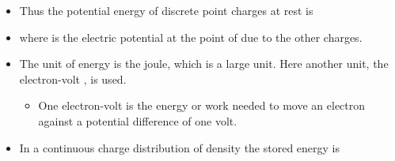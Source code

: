 \begin{ELjoin}

\begin{itemize}
\tightlist
\item
  Thus the potential energy of  discrete point charges at rest is
\end{itemize}

\begin{ELimportant}{}


\end{ELimportant}

\end{ELjoin}

\begin{ELunit}

\begin{itemize}
\tightlist
\item
  where  is the electric potential at the point of  due to the other charges.
\item
  The  unit of energy is the joule, which is a large unit. Here another unit, the electron-volt , is used.

  \begin{itemize}
  \tightlist
  \item
    One electron-volt is the energy or work needed to move an electron against a potential difference of one volt.
  \end{itemize}
\end{itemize}


\end{ELunit}

\begin{ELjoin}

\begin{itemize}
\tightlist
\item
  In a continuous charge distribution of density \ELim{\rho} the stored energy is
\end{itemize}

\begin{ELimportant}{}


\end{ELimportant}

\end{ELjoin}

